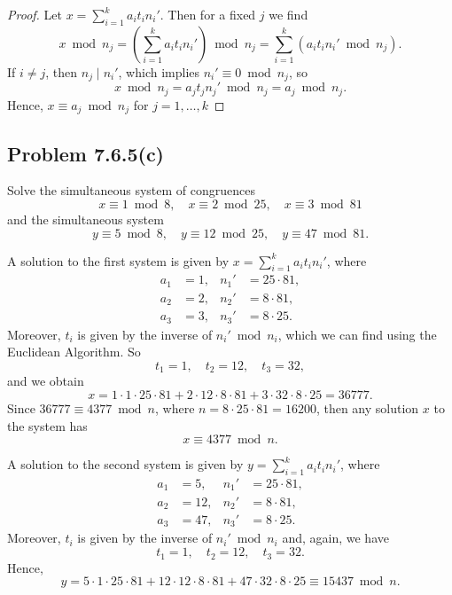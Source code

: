 \documentclass[12pt]{article}
\newenvironment{pbox}{\begin{lrbox}{\mybox}\begin{minipage}{0.98\textwidth}}{\end{minipage}\end{lrbox}\begin{center}\framebox[\textwidth]{\usebox{\mybox}}\end{center}}
\theoremstyle{definition}
\renewcommand{\mod}{\bmod}
\begin{document}
\begin{proof}
    Let $x = \sum_{i=1}^k a_it_in_i'$. Then for a fixed $j$ we find
    \[
        x \mod n_j
            = \left(\sum_{i=1}^k a_it_in_i'\right) \mod n_j 
            = \sum_{i=1}^k \left(a_it_in_i' \mod n_j\right).
    \]
    If $i \ne j$, then $n_j \mid n_i'$, which implies $n_i' \equiv 0 \mod n_j$, so
    \[
        x \mod n_j = a_jt_jn_j' \mod n_j = a_j \mod n_j.
    \]
    Hence, $x \equiv a_j \mod n_j$ for $j = 1, \dots, k$
    
\end{proof}

\subsection{Problem 7.6.5(c)}
\begin{pbox}
    Solve the simultaneous system of congruences
    \[
        x \equiv 1 \mod 8, \quad x \equiv 2 \mod 25, \quad x \equiv 3 \mod 81
    \]
    and the simultaneous system
    \[
        y \equiv 5 \mod 8, \quad y \equiv 12 \mod 25, \quad y \equiv 47 \mod 81.
    \]
\end{pbox}

A solution to the first system is given by $x = \sum_{i=1}^k a_it_in_i'$, where
\begin{align*}
    a_1 &= 1, & n_1' &= 25 \cdot 81, \\
    a_2 &= 2, & n_2' &= 8 \cdot 81, \\
    a_3 &= 3, & n_3' &= 8 \cdot 25.
\end{align*}
Moreover, $t_i$ is given by the inverse of $n_i' \mod n_i$, which we can find using the Euclidean Algorithm. So
\[
    t_1 = 1, \quad t_2 = 12, \quad t_3 = 32,
\]
and we obtain
\[
    x = 1 \cdot 1 \cdot 25 \cdot 81 + 2 \cdot 12 \cdot 8 \cdot 81 + 3 \cdot 32 \cdot 8 \cdot 25 = 36777.
\]
Since $36777 \equiv 4377 \mod n$, where $n = 8 \cdot 25 \cdot 81 = 16200$, then any solution $x$ to the system has
\[
    x \equiv 4377 \mod n.
\]

A solution to the second system is given by $y = \sum_{i=1}^k a_it_in_i'$, where
\begin{align*}
    a_1 &= 5, & n_1' &= 25 \cdot 81, \\
    a_2 &= 12, & n_2' &= 8 \cdot 81, \\
    a_3 &= 47, & n_3' &= 8 \cdot 25.
\end{align*}
Moreover, $t_i$ is given by the inverse of $n_i' \mod n_i$ and, again, we have
\[
    t_1 = 1, \quad t_2 = 12, \quad t_3 = 32.
\]
Hence,
\[
    y = 5 \cdot 1 \cdot 25 \cdot 81 + 12 \cdot 12 \cdot 8 \cdot 81 + 47 \cdot 32 \cdot 8 \cdot 25 \equiv 15437 \mod n.
\]
\end{document}
